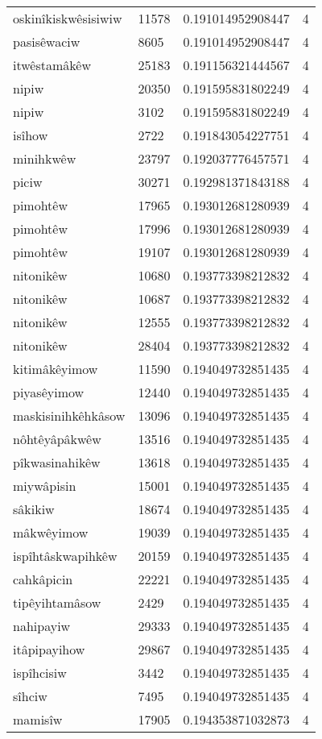 \begin{longtable}{llll}
oskinîkiskwêsisiwiw & 11578 & 0.191014952908447 & 4 \\
pasisêwaciw & 8605 & 0.191014952908447 & 4 \\
itwêstamâkêw & 25183 & 0.191156321444567 & 4 \\
nipiw & 20350 & 0.191595831802249 & 4 \\
nipiw & 3102 & 0.191595831802249 & 4 \\
isîhow & 2722 & 0.191843054227751 & 4 \\
minihkwêw & 23797 & 0.192037776457571 & 4 \\
piciw & 30271 & 0.192981371843188 & 4 \\
pimohtêw & 17965 & 0.193012681280939 & 4 \\
pimohtêw & 17996 & 0.193012681280939 & 4 \\
pimohtêw & 19107 & 0.193012681280939 & 4 \\
nitonikêw & 10680 & 0.193773398212832 & 4 \\
nitonikêw & 10687 & 0.193773398212832 & 4 \\
nitonikêw & 12555 & 0.193773398212832 & 4 \\
nitonikêw & 28404 & 0.193773398212832 & 4 \\
kitimâkêyimow & 11590 & 0.194049732851435 & 4 \\
piyasêyimow & 12440 & 0.194049732851435 & 4 \\
maskisinihkêhkâsow & 13096 & 0.194049732851435 & 4 \\
nôhtêyâpâkwêw & 13516 & 0.194049732851435 & 4 \\
pîkwasinahikêw & 13618 & 0.194049732851435 & 4 \\
miywâpisin & 15001 & 0.194049732851435 & 4 \\
sâkikiw & 18674 & 0.194049732851435 & 4 \\
mâkwêyimow & 19039 & 0.194049732851435 & 4 \\
ispîhtâskwapihkêw & 20159 & 0.194049732851435 & 4 \\
cahkâpicin & 22221 & 0.194049732851435 & 4 \\
tipêyihtamâsow & 2429 & 0.194049732851435 & 4 \\
nahipayiw & 29333 & 0.194049732851435 & 4 \\
itâpipayihow & 29867 & 0.194049732851435 & 4 \\
ispîhcisiw & 3442 & 0.194049732851435 & 4 \\
sîhciw & 7495 & 0.194049732851435 & 4 \\
mamisîw & 17905 & 0.194353871032873 & 4 \\

\end{longtable}
